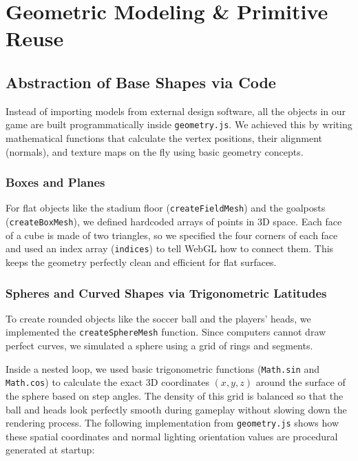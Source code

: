 \chapter{Geometric Modeling \& Primitive Reuse}

\section{Abstraction of Base Shapes via Code}
Instead of importing models from external design software, all the objects in our game are built programmatically inside \texttt{geometry.js}. We achieved this by writing mathematical functions that calculate the vertex positions, their alignment (normals), and texture maps on the fly using basic geometry concepts.

\subsection{Boxes and Planes}
For flat objects like the stadium floor (\texttt{createFieldMesh}) and the goalposts (\texttt{createBoxMesh}), we defined hardcoded arrays of points in 3D space. Each face of a cube is made of two triangles, so we specified the four corners of each face and used an index array (\texttt{indices}) to tell WebGL how to connect them. This keeps the geometry perfectly clean and efficient for flat surfaces.

\subsection{Spheres and Curved Shapes via Trigonometric Latitudes}
To create rounded objects like the soccer ball and the players' heads, we implemented the \texttt{createSphereMesh} function. Since computers cannot draw perfect curves, we simulated a sphere using a grid of rings and segments. 

Inside a nested loop, we used basic trigonometric functions (\texttt{Math.sin} and \texttt{Math.cos}) to calculate the exact 3D coordinates $(x, y, z)$ around the surface of the sphere based on step angles. The density of this grid is balanced so that the ball and heads look perfectly smooth during gameplay without slowing down the rendering process. The following implementation from \texttt{geometry.js} shows how these spatial coordinates and normal lighting orientation values are procedural generated at startup:


